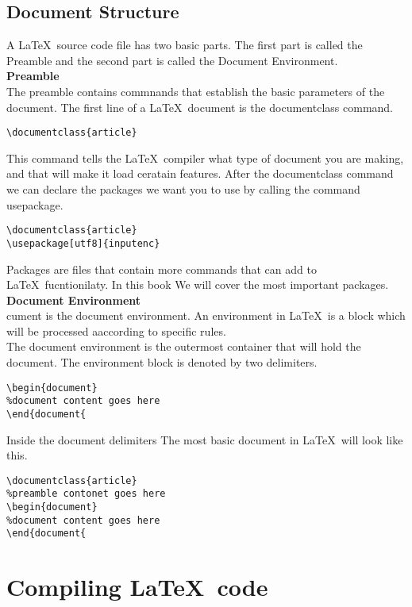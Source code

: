 \documentclass[12pt]{book}
\begin{document}
\subsection{Document Structure}
A \LaTeX \ source code file has two basic parts. The first part is called the Preamble and the second part is 
called the Document Environment.\\
\textbf{Preamble}\\
The preamble contains commnands that establish the basic parameters of the document.
The first line of a \LaTeX \ document is the documentclass command. 
\begin{lstlisting}[language={[latex]tex}]
\documentclass{article}
\end{lstlisting}
This command tells the \LaTeX \ compiler what type of document you are making, and that will make it load ceratain features.
After the documentclass command we can declare the packages we want you to use by calling the command usepackage.
\begin{lstlisting}[language={[latex]tex}]
\documentclass{article}
\usepackage[utf8]{inputenc}
\end{lstlisting}
Packages are files that contain more commands that can add to \LaTeX \ fucntionilaty. In this book We will cover the 
most important packages. 
\textbf{Document Environment}\\
cument is the document environment. An environment in \LaTeX \ is a block which will be processed aaccording to specific rules.\\ 
The document environment is the outermost container that will hold the
document. The environment block is denoted by two delimiters.
\begin{lstlisting}[language={[LaTeX]TeX}]
\begin{document}
%document content goes here
\end{document{
\end{lstlisting}
Inside the document delimiters 
The most basic document in \LaTeX \ will look like this.
\begin{lstlisting}[language={[LaTeX]TeX}]
\documentclass{article}
%preamble contonet goes here
\begin{document}
%document content goes here
\end{document{
\end{lstlisting}
\newpage
\section{Compiling \LaTeX \ code}
\end{document}
